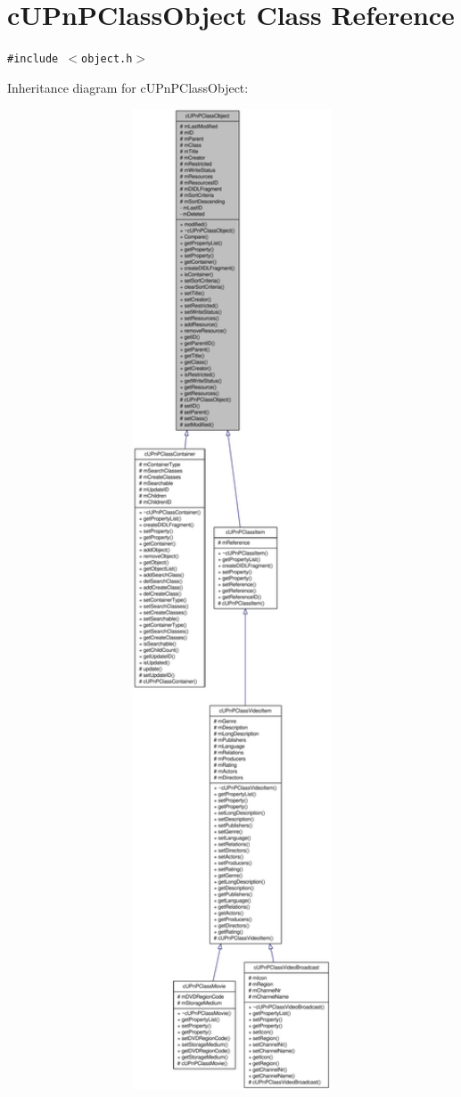 \hypertarget{classcUPnPClassObject}{
\section{cUPnPClassObject Class Reference}
\label{classcUPnPClassObject}
}
{\tt \#include $<$object.h$>$}

Inheritance diagram for cUPnPClassObject:\nopagebreak
\begin{figure}[H]
\begin{center}
\leavevmode
\includegraphics[width=400pt]{classcUPnPClassObject__inherit__graph}
\end{center}
\end{figure}
